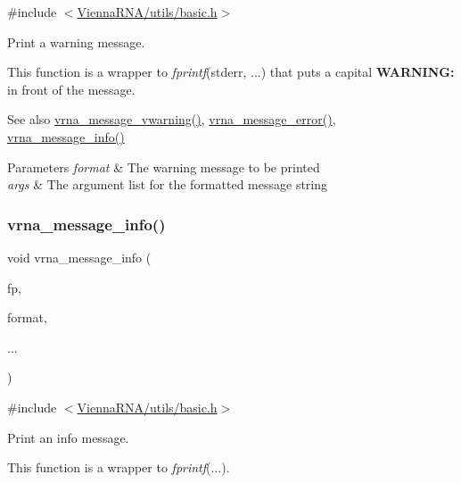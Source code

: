 {\ttfamily \#include $<$\hyperlink{utils_2basic_8h}{Vienna\+R\+N\+A/utils/basic.\+h}$>$}



Print a warning message. 

This function is a wrapper to {\itshape fprintf}(stderr, ...) that puts a capital {\bfseries W\+A\+R\+N\+I\+NG\+:} in front of the message.

\begin{DoxySeeAlso}{See also}
\hyperlink{group__message__utils_ga377aa8ec8a49d343063adb22e6311f26}{vrna\+\_\+message\+\_\+vwarning()}, \hyperlink{group__message__utils_ga36b35be01d7f36cf7f59c245eee628d1}{vrna\+\_\+message\+\_\+error()}, \hyperlink{group__message__utils_ga039bae6153a6415b054dbe6045f83d03}{vrna\+\_\+message\+\_\+info()}
\end{DoxySeeAlso}

\begin{DoxyParams}{Parameters}
{\em format} & The warning message to be printed \\
\hline
{\em args} & The argument list for the formatted message string \\
\hline
\end{DoxyParams}
\mbox{\label{group__message__utils_ga039bae6153a6415b054dbe6045f83d03}} 
\subsubsection{\texorpdfstring{vrna\+\_\+message\+\_\+info()}{vrna\_message\_info()}}
{\footnotesize\ttfamily void vrna\+\_\+message\+\_\+info (\begin{DoxyParamCaption}\item[{F\+I\+LE $\ast$}]{fp,  }\item[{const char $\ast$}]{format,  }\item[{}]{... }\end{DoxyParamCaption})}



{\ttfamily \#include $<$\hyperlink{utils_2basic_8h}{Vienna\+R\+N\+A/utils/basic.\+h}$>$}



Print an info message. 

This function is a wrapper to {\itshape fprintf}(...).

